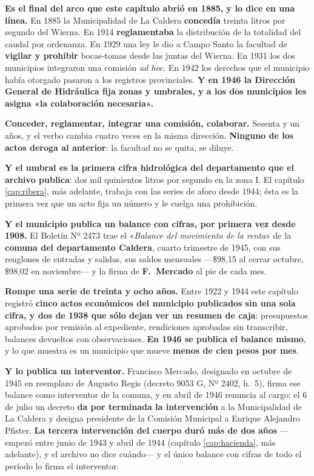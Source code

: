 \begin{cautela}
\textbf{Es el final del arco que este capítulo abrió en 1885, y lo dice en una
línea.} En 1885 la Municipalidad de La Caldera \textbf{concedía} treinta litros
por segundo del Wierna. En 1914 \textbf{reglamentaba} la distribución de la
totalidad del caudal por ordenanza. En 1929 una ley le dio a Campo Santo la
facultad de \textbf{vigilar y prohibir} bocas-tomas desde las juntas del Wierna.
En 1931 los dos municipios integraron una comisión \textit{ad hoc}. En 1942 los
derechos que el municipio había otorgado pasaron a los registros provinciales.
\textbf{Y en 1946 la Dirección General de Hidráulica fija zonas y umbrales, y a
los dos municipios les asigna «la colaboración necesaria».}

\textbf{Conceder, reglamentar, integrar una comisión, colaborar.} Sesenta y un
años, y el verbo cambia cuatro veces en la misma dirección. \textbf{Ninguno de
los actos deroga al anterior}: la facultad no se quita, se diluye.

\textbf{Y el umbral es la primera cifra hidrológica del departamento que el
archivo publica}: dos mil quinientos litros por segundo en la zona I. El
capítulo \ref{cap:ribera}, más adelante, trabaja con las series de aforo desde 1944; ésta es la
primera vez que un acto fija un número y le cuelga una prohibición.
\end{cautela}

\begin{cautela}
\textbf{Y el municipio publica un balance con cifras, por primera vez desde
1908.} El Boletín Nº 2473 trae el «\textit{Balance del movimiento de la renta}»
de la \textbf{comuna del departamento Caldera}, cuarto trimestre de 1945, con
sus renglones de entradas y salidas, sus saldos mensuales ---\$98,15 al cerrar
octubre, \$98,02 en noviembre--- y la firma de \textbf{F.\ Mercado} al pie de
cada mes.

\textbf{Rompe una serie de treinta y ocho años.} Entre 1922 y 1944 este capítulo
registró \textbf{cinco actos económicos del municipio publicados sin una sola
cifra, y dos de 1938 que sólo dejan ver un resumen de caja}: presupuestos aprobados por remisión al expediente, rendiciones
aprobadas sin transcribir, balances devueltos con observaciones. \textbf{En 1946
se publica el balance mismo}, y lo que muestra es un municipio que mueve
\textbf{menos de cien pesos por mes}.

\textbf{Y lo publica un interventor.} Francisco Mercado, designado en octubre de 1945 en
reemplazo de Augusto Regis (decreto 9053 G, Nº 2402, h.\ 5), firma ese balance como
interventor de la comuna, y en abril de 1946 renuncia al cargo; el 6 de julio
un decreto \textbf{da por terminada la intervención} a la Municipalidad de La
Caldera y designa presidente de la Comisión Municipal a Enrique Alejandro
Pfister. \textbf{La tercera intervención del cuerpo duró más de dos años}
---empezó entre junio de 1943 y abril de 1944 (capítulo \ref{cap:hacienda}, más adelante), y el archivo no dice cuándo--- y el único
balance con cifras de todo el período lo firma el interventor.
\end{cautela}

